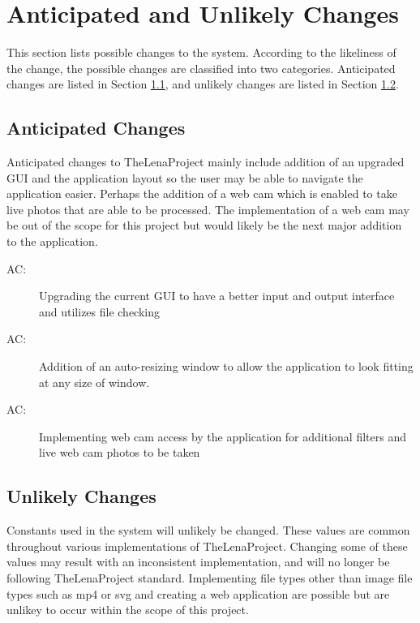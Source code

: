 \documentclass[12pt, titlepage]{article}
\newcounter{acnum}
\newcommand{\actheacnum}{AC\theacnum}
\begin{document}
\section{Anticipated and Unlikely Changes} \label{SecChange}

This section lists possible changes to the system. According to the likeliness
of the change, the possible changes are classified into two
categories. Anticipated changes are listed in Section \ref{SecAchange}, and
unlikely changes are listed in Section \ref{SecUchange}.

\subsection{Anticipated Changes} \label{SecAchange}

Anticipated changes to TheLenaProject mainly include addition of an upgraded GUI and the application layout so the user may be able to navigate the application easier. Perhaps the addition of a web cam which is enabled to take live photos that are able to be processed. The implementation of a web cam may be out of the scope for this project but would likely be the next major addition to the application.

\begin{description}
\item[ \actheacnum \label{acHardware}:] Upgrading the current GUI to have a better input and output interface and utilizes file checking
\item[ \actheacnum \label{acInput}:] Addition of an auto-resizing window to allow the application to look fitting at any size of window.
\item[ \actheacnum \label{acInput}:] Implementing web cam access by the application for additional filters and live web cam photos to be taken
\end{description}

\subsection{Unlikely Changes} \label{SecUchange}

Constants used in the system will unlikely be changed. These values are common throughout
various implementations of TheLenaProject. Changing some of these values may result with an
inconsistent implementation, and will no longer be following TheLenaProject standard. Implementing file types other than image file types such as mp4 or svg and creating a web application are possible but are unlikey to occur within the scope of this project.
\\
\end{document}
